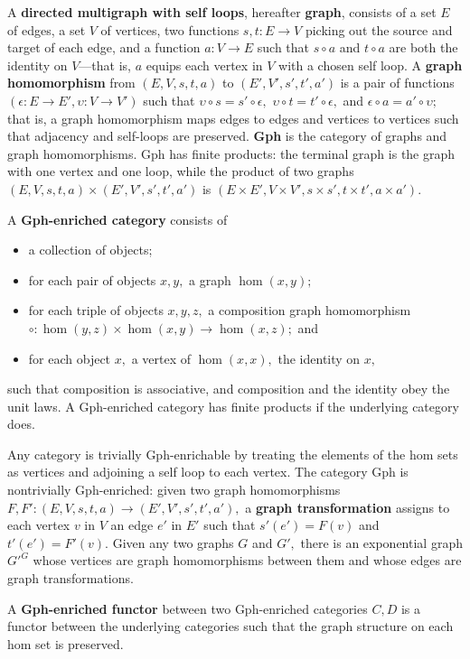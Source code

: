 \documentclass[a4paper,UKenglish]{article}
\newcommand{\maps}{\colon}
\begin{document}
A {\bf directed multigraph with self loops}, hereafter {\bf graph}, consists of a set $E$ of edges, a set $V$ of vertices, two functions $s,t\maps E \to V$ picking out the source and target of each edge, and a function $a\maps V \to E$ such that $s\circ a$ and $t \circ a$ are both the identity on $V$---that is, $a$ equips each vertex in $V$ with a chosen self loop.  A {\bf graph homomorphism} from $(E, V, s, t, a)$ to $(E', V', s', t', a')$ is a pair of functions $(\epsilon\maps E \to E', \upsilon\maps V \to V')$ such that $\upsilon\circ s = s' \circ \epsilon,$ $\upsilon\circ t = t' \circ \epsilon,$ and $\epsilon \circ a = a' \circ \upsilon;$ that is, a graph homomorphism maps edges to edges and vertices to vertices such that adjacency and self-loops are preserved.  {\bf Gph} is the category of graphs and graph homomorphisms.  Gph has finite products: the terminal graph is the graph with one vertex and one loop, while the product of two graphs $(E, V, s, t, a) \times (E', V', s', t', a')$ is $(E \times E', V \times V', s \times s', t\times t', a \times a').$

A {\bf Gph-enriched category} consists of
\begin{itemize}
  \item a collection of objects;
  \item for each pair of objects $x, y,$ a graph $\hom(x,y);$
  \item for each triple of objects $x, y, z,$ a composition graph homomorphism $\circ\maps \hom(y, z) \times \hom(x, y) \to \hom(x, z);$ and
  \item for each object $x,$ a vertex of $\hom(x, x),$ the identity on $x,$
\end{itemize}
such that composition is associative, and composition and the identity obey the unit laws.  A Gph-enriched category has finite products if the underlying category does.

Any category is trivially Gph-enrichable by treating the elements of the hom sets as vertices and adjoining a self loop to each vertex.  The category Gph is nontrivially Gph-enriched: given two graph homomorphisms $F, F'\maps (E, V, s, t, a) \to (E', V', s', t', a'),$ a {\bf graph transformation} assigns to each vertex $v$ in $V$ an edge $e'$ in $E'$ such that $s'(e') = F(v)$ and $t'(e') = F'(v).$  Given any two graphs $G$ and $G',$ there is an exponential graph $G'^G$ whose vertices are graph homomorphisms between them and whose edges are graph transformations.

A {\bf Gph-enriched functor} between two Gph-enriched categories $C, D$ is a functor between the underlying categories such that the graph structure on each hom set is preserved.
\end{document}
